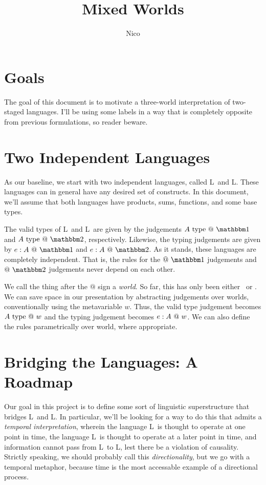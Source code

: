 \documentclass[]{article}
\title{Mixed Worlds}
\author{Nico}
\begin{document}
\maketitle

\section {Goals}

The goal of this document is to motivate a three-world interpretation of two-staged languages.
I'll be using some labels in a way that is completely opposite from previous formulations,
so reader beware.  

\section {Two Independent Languages}

As our baseline, we start with two independent languages, called L\bbone\ and L\bbtwo.
These languages can in general have any desired set of constructs.
In this document, we'll assume that both languages have products, sums, functions, and some base types.

The valid types of L\bbone\ and L\bbtwo\ are given by the judgements 
$A \istypeone$ and $A \istypetwo$, respectively.
Likewise, the typing judgements are given by
$\colone e A$ and $\coltwo e A$.
As it stands, these languages are completely independent.
That is, the rules for the $@~\bbone$ judgements and $@~\bbtwo$ judgements never depend on each other.

We call the thing after the $@$ sign a {\em world}.
So far, this has only been either \bbone\ or \bbtwo.
We can save space in our presentation by abstracting judgements over worlds,
conventionally using the metavariable $w$.
Thus, the valid type judgement becomes $A ~{\rm type}~@~w$ 
and the typing judgement becomes ${e}:{A}~@~w$.  
We can also define the rules parametrically over world, where appropriate.

\section{Bridging the Languages: A Roadmap}

Our goal in this project is to define some sort of linguistic superstructure that bridges L\bbone\ and L\bbtwo.
In particular, we'll be looking for a way to do this that admits a {\em temporal interpretation},
wherein the language L\bbone\ is thought to operate at one point in time, 
the language L\bbtwo\ is thought to operate at a later point in time, 
and information cannot pass from L\bbtwo\ to L\bbone, 
lest there be a violation of causality.
Strictly speaking, we should probably call this {\em directionality},
but we go with a temporal metaphor, because time is the most accessable example of a directional process.
\end{document}
